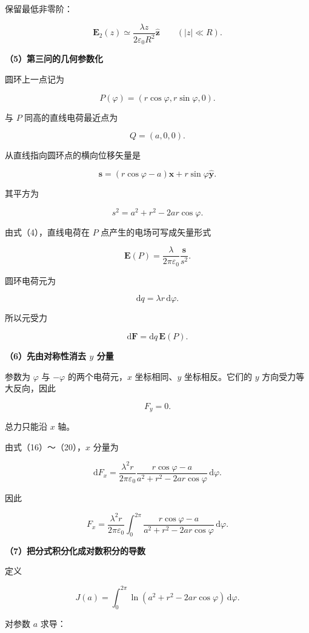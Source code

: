 \documentclass[12pt,a4paper,UTF8]{ctexart}
\begin{document}
保留最低非零阶：

\[
\boxed{
\boldsymbol E_2(z)
\simeq\frac{\lambda z}{2\varepsilon_0R^2}
\hat{\boldsymbol z}
\qquad(|z|\ll R)
}.
\tag{14}
\]

\textbf{（5）第三问的几何参数化}

圆环上一点记为

\[
P(\varphi)
=(r\cos\varphi,r\sin\varphi,0).
\tag{15}
\]

与 \(P\) 同高的直线电荷最近点为

\[
Q=(a,0,0).
\]

从直线指向圆环点的横向位移矢量是

\[
\boldsymbol s
=(r\cos\varphi-a)\hat{\boldsymbol x}
+r\sin\varphi\hat{\boldsymbol y}.
\tag{16}
\]

其平方为

\[
s^2
=a^2+r^2-2ar\cos\varphi.
\tag{17}
\]

由式（4），直线电荷在 \(P\) 点产生的电场可写成矢量形式

\[
\boldsymbol E(P)
=\frac{\lambda}{2\pi\varepsilon_0}
\frac{\boldsymbol s}{s^2}.
\tag{18}
\]

圆环电荷元为

\[
\mathrm dq=\lambda r\,\mathrm d\varphi.
\tag{19}
\]

所以元受力

\[
\mathrm d\boldsymbol F
=\mathrm dq\,\boldsymbol E(P).
\tag{20}
\]

\textbf{（6）先由对称性消去 \(y\) 分量}

参数为 \(\varphi\) 与 \(-\varphi\) 的两个电荷元，\(x\) 坐标相同、\(y\)
坐标相反。它们的 \(y\) 方向受力等大反向，因此

\[
\boxed{F_y=0}.
\tag{21}
\]

总力只能沿 \(x\) 轴。

由式（16）～（20），\(x\) 分量为

\[
\mathrm dF_x
=\frac{\lambda^2r}{2\pi\varepsilon_0}
\frac{r\cos\varphi-a}
{a^2+r^2-2ar\cos\varphi}
\,\mathrm d\varphi.
\tag{22}
\]

因此

\[
F_x
=\frac{\lambda^2r}{2\pi\varepsilon_0}
\int_0^{2\pi}
\frac{r\cos\varphi-a}
{a^2+r^2-2ar\cos\varphi}
\,\mathrm d\varphi.
\tag{23}
\]

\textbf{（7）把分式积分化成对数积分的导数}

定义

\[
J(a)=\int_0^{2\pi}
\ln\!\left(a^2+r^2-2ar\cos\varphi\right)
\,\mathrm d\varphi.
\tag{24}
\]

对参数 \(a\) 求导：
\end{document}

